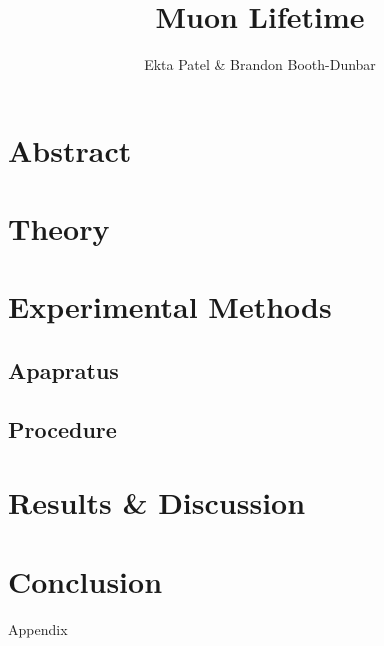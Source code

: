 
\newcommand{\ig}[2][width=4in]{\texttt{[image: \#2]}}    		
\usepackage{graphicx}					
\usepackage{amssymb}
\usepackage{pgfplotstable}
\usepackage{float}
\usepackage{caption}
\captionsetup[table]{justification=justified,singlelinecheck=false, position=bottom}


\header {\today}							
\title{Muon Lifetime}
\author{Ekta Patel \& Brandon Booth-Dunbar}

\section{Abstract}
\begin{em}
\end{em}

\section{Theory}

\section{Experimental Methods}
\subsection{Apapratus}
\subsection{Procedure}


\section{Results \& Discussion}

\section{Conclusion}

\begin{thebibliography}{99}
\end{thebibliography}

\newpage \LARGE{Appendix}

  